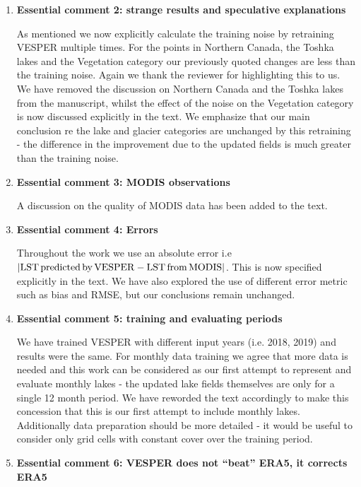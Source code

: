 \documentclass[10pt]{article}
\begin{document}
\begin{enumerate}
	
		\item \textbf{Essential comment 2: strange results and speculative explanations}
		
		As mentioned we now explicitly calculate the training noise by retraining VESPER multiple times. For the points in Northern Canada, the Toshka lakes and the Vegetation category our previously quoted changes are less than the training noise. Again we thank the reviewer for highlighting this to us. We have removed the discussion on  Northern Canada and the Toshka lakes from the manuscript, whilst the effect of the noise on the Vegetation category is now discussed explicitly in the text. We emphasize that our main conclusion re the lake and glacier categories are unchanged by this retraining - the difference in the improvement due to the updated fields is much greater than the training noise.
		
		
		
	\item \textbf{Essential comment 3: MODIS observations}
	
	A discussion on the quality of MODIS data has been added to the text. 
	
	
		\item \textbf{Essential comment 4: Errors}
		
	Throughout the work we use an absolute error i.e $ |{\rm LST \, predicted \, by \,  VESPER} - {\rm LST \, from \, MODIS} |$. This is now specified explicitly in the text. We have also explored the use of different error metric such as bias and RMSE, but our conclusions remain unchanged.
	
	 
		\item \textbf{Essential comment 5: training and evaluating periods}
		
		We have trained VESPER with different input years (i.e. 2018, 2019) and results were the same. For monthly data training we agree that more data is needed and this work can be considered as our first attempt to represent and evaluate monthly lakes - the updated lake fields themselves are only for a single 12 month period. We have reworded the text accordingly to make this concession that this is our first attempt to include monthly lakes. Additionally data preparation should be more detailed - it would be useful to consider only grid cells with constant cover over the training period. 
		
		
		\item \textbf{Essential comment 6: VESPER does not “beat” ERA5, it corrects ERA5}
		

\end{enumerate}
\end{document}
